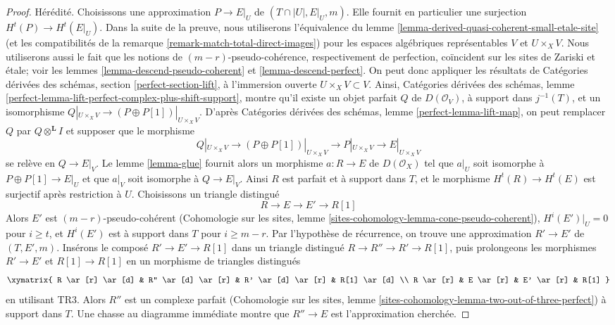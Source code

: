 \begin{proof}
\medskip\noindent
H\'er\'edit\'e. Choisissons une approximation $P\to E|_U$ de
$(T\cap|U|,E|_U,m)$. Elle fournit en particulier une surjection
$H^t(P)\to H^t(E|_U)$. Dans la suite de la preuve, nous utiliserons
l'\'equivalence du lemme
\ref{lemma-derived-quasi-coherent-small-etale-site} (et les compatibilit\'es de
la remarque \ref{remark-match-total-direct-images}) pour les espaces
alg\'ebriques repr\'esentables $V$ et $U\times_XV$. Nous utiliserons aussi le
fait que les notions de $(m-r)$-pseudo-coh\'erence, respectivement de
perfection, co\"incident sur les sites de Zariski et \'etale; voir les lemmes
\ref{lemma-descend-pseudo-coherent} et \ref{lemma-descend-perfect}.
On peut donc appliquer les r\'esultats de Cat\'egories d\'eriv\'ees des sch\'emas,
section \ref{perfect-section-lift}, \`a l'immersion ouverte
$U\times_XV\subset V$. Ainsi, Cat\'egories d\'eriv\'ees des sch\'emas, lemme
\ref{perfect-lemma-lift-perfect-complex-plus-shift-support}, montre qu'il
existe un objet parfait $Q$ de $D(\mathcal{O}_V)$, \`a support dans
$j^{-1}(T)$, et un isomorphisme
$Q|_{U\times_XV}\to(P\oplus P[1])|_{U\times_XV}$. D'apr\`es Cat\'egories
d\'eriv\'ees des sch\'emas, lemme \ref{perfect-lemma-lift-map}, on peut
remplacer $Q$ par $Q\otimes^\mathbf{L}I$ et supposer que le morphisme
$$
Q|_{U \times_X V} \longrightarrow
(P \oplus P[1])|_{U \times_X V} \longrightarrow
P|_{U \times_X V} \longrightarrow E|_{U \times_X V}
$$
se rel\`eve en $Q\to E|_V$. Le lemme \ref{lemma-glue} fournit alors un
morphisme $a:R\to E$ de $D(\mathcal{O}_X)$ tel que $a|_U$ soit isomorphe \`a
$P\oplus P[1]\to E|_U$ et que $a|_V$ soit isomorphe \`a $Q\to E|_V$.
Ainsi $R$ est parfait et \`a support dans $T$, et le morphisme
$H^t(R)\to H^t(E)$ est surjectif apr\`es restriction \`a $U$.
Choisissons un triangle distingu\'e
$$
R \to E \to E' \to R[1]
$$
Alors $E'$ est $(m-r)$-pseudo-coh\'erent (Cohomologie sur les sites, lemme
\ref{sites-cohomology-lemma-cone-pseudo-coherent}), $H^i(E')|_U=0$ pour
$i\geq t$, et $H^i(E')$ est \`a support dans $T$ pour $i\geq m-r$.
Par l'hypoth\`ese de r\'ecurrence, on trouve une approximation $R'\to E'$ de
$(T,E',m)$. Ins\'erons le compos\'e $R'\to E'\to R[1]$ dans un triangle
distingu\'e $R\to R''\to R'\to R[1]$, puis prolongeons les morphismes
$R'\to E'$ et $R[1]\to R[1]$ en un morphisme de triangles distingu\'es
$$
\xymatrix{
R \ar[r] \ar[d] & R'' \ar[d] \ar[r] & R' \ar[d] \ar[r] & R[1] \ar[d] \\
R \ar[r] &  E \ar[r] & E' \ar[r] & R[1]
}
$$
en utilisant TR3. Alors $R''$ est un complexe parfait (Cohomologie sur les
sites, lemme \ref{sites-cohomology-lemma-two-out-of-three-perfect}) \`a support
dans $T$. Une chasse au diagramme imm\'ediate montre que $R''\to E$ est
l'approximation cherch\'ee.
\end{proof}

